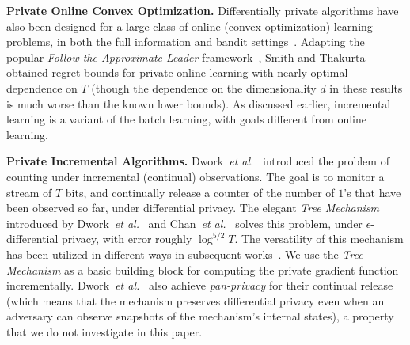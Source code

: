 \documentclass{article}
\theoremstyle{plain}
\def \eps {\epsilon}
\begin{document}
\smallskip
\noindent\textbf{Private Online Convex Optimization.} Differentially private algorithms have also been designed for a large class of online (convex optimization) learning problems, in both the full information and bandit settings~\cite{DBLP:journals/jmlr/JainKT12,thakurta2013nearly,jain2014near}. Adapting the popular {\em Follow the Approximate Leader} framework~\cite{hazan2006logarithmic}, Smith and Thakurta~\cite{thakurta2013nearly} obtained regret bounds for private online learning with nearly optimal dependence on $T$ (though the dependence on the dimensionality $d$ in these results is much worse than the known lower bounds). As discussed earlier, incremental learning is a variant of the batch learning, with goals different from online learning.


\smallskip
\noindent\textbf{Private Incremental Algorithms.} Dwork~\emph{et al.}\ \cite{DNPR10} introduced the problem of counting under incremental (continual) observations. The goal is to monitor a stream of $T$ bits, and continually release a counter of the number of $1$'s that have been observed so far, under differential privacy. The elegant \emph{Tree Mechanism} introduced by Dwork~\emph{et al.}\ \cite{DNPR10} and Chan~\emph{et al.}\ \cite{CSS11} solves this problem, under $\eps$-differential privacy, with error roughly $\log^{5/2} T$. The versatility of this mechanism has been utilized in different ways in subsequent works~\cite{thakurta2013nearly,DNRR15,hsu2014private}. We use the \emph{Tree Mechanism} as a basic building block for computing the private gradient function incrementally. Dwork~\emph{et al.}\ \cite{DNPR10} also achieve {\em pan-privacy} for their continual release (which means that the mechanism preserves differential privacy even when an adversary can observe snapshots of the mechanism's internal states), a property that we do not investigate in this paper.

\end{document}
